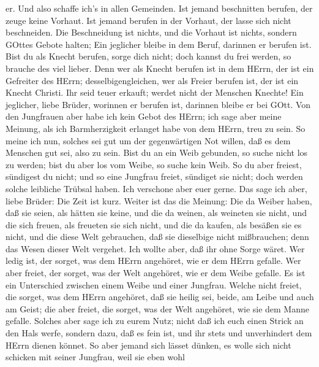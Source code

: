 er. Und also schaffe ich's in allen Gemeinden.  Ist jemand
beschnitten berufen, der zeuge keine Vorhaut. Ist jemand berufen in der
Vorhaut, der lasse sich nicht beschneiden.  Die
Beschneidung ist nichts, und die Vorhaut ist nichts, sondern GOttes
Gebote halten;  Ein jeglicher bleibe in dem Beruf, darinnen
er berufen ist.  Bist du als Knecht berufen, sorge dich
nicht; doch kannst du frei werden, so brauche des viel lieber.
 Denn wer als Knecht berufen ist in dem HErrn, der ist ein
Gefreiter des HErrn; desselbigengleichen, wer als Freier berufen ist,
der ist ein Knecht Christi.  Ihr seid teuer erkauft; werdet
nicht der Menschen Knechte!  Ein jeglicher, liebe Brüder,
worinnen er berufen ist, darinnen bleibe er bei GOtt.  Von
den Jungfrauen aber habe ich kein Gebot des HErrn; ich sage aber meine
Meinung, als ich Barmherzigkeit erlanget habe von dem HErrn, treu zu
sein.  So meine ich nun, solches sei gut um der
gegenwärtigen Not willen, daß es dem Menschen gut sei, also zu sein.
 Bist du an ein Weib gebunden, so suche nicht los zu
werden; bist du aber los vom Weibe, so suche kein Weib.  So
du aber freiest, sündigest du nicht; und so eine Jungfrau freiet,
sündiget sie nicht; doch werden solche leibliche Trübsal haben. Ich
verschone aber euer gerne.  Das sage ich aber, liebe
Brüder: Die Zeit ist kurz. Weiter ist das die Meinung: Die da Weiber
haben, daß sie seien, als hätten sie keine, und die da weinen, als
weineten sie nicht,  und die sich freuen, als freueten sie
sich nicht, und die da kaufen, als besäßen sie es nicht, 
und die diese Welt gebrauchen, daß sie dieselbige nicht mißbrauchen;
denn das Wesen dieser Welt vergehet.  Ich wollte aber, daß
ihr ohne Sorge wäret. Wer ledig ist, der sorget, was dem HErrn
angehöret, wie er dem HErrn gefalle.  Wer aber freiet, der
sorget, was der Welt angehöret, wie er dem Weibe gefalle. Es ist ein
Unterschied zwischen einem Weibe und einer Jungfrau. 
Welche nicht freiet, die sorget, was dem HErrn angehöret, daß sie heilig
sei, beide, am Leibe und auch am Geist; die aber freiet, die sorget, was
der Welt angehöret, wie sie dem Manne gefalle.  Solches
aber sage ich zu eurem Nutz; nicht daß ich euch einen Strick an den Hals
werfe, sondern dazu, daß es fein ist, und ihr stets und unverhindert dem
HErrn dienen könnet.  So aber jemand sich lässet dünken, es
wolle sich nicht schicken mit seiner Jungfrau, weil sie eben wohl
